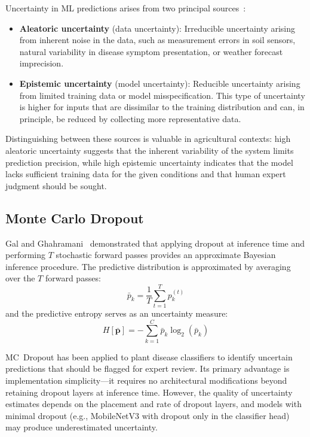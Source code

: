 \documentclass[journal]{IEEEtran}
\begin{document}
Uncertainty in ML predictions arises from two principal sources~\cite{abdar2021review}:
\begin{itemize}[leftmargin=*]
  \item \textbf{Aleatoric uncertainty} (data uncertainty): Irreducible uncertainty arising from inherent noise in the data, such as measurement errors in soil sensors, natural variability in disease symptom presentation, or weather forecast imprecision.
  
  \item \textbf{Epistemic uncertainty} (model uncertainty): Reducible uncertainty arising from limited training data or model misspecification. This type of uncertainty is higher for inputs that are dissimilar to the training distribution and can, in principle, be reduced by collecting more representative data.
\end{itemize}

Distinguishing between these sources is valuable in agricultural contexts: high aleatoric uncertainty suggests that the inherent variability of the system limits prediction precision, while high epistemic uncertainty indicates that the model lacks sufficient training data for the given conditions and that human expert judgment should be sought.

\subsection{Monte Carlo Dropout}

Gal and Ghahramani~\cite{gal2016dropout} demonstrated that applying dropout at inference time and performing $T$ stochastic forward passes provides an approximate Bayesian inference procedure. The predictive distribution is approximated by averaging over the $T$ forward passes:
\begin{equation}
  \bar{p}_k = \frac{1}{T} \sum_{t=1}^{T} p_k^{(t)}
\end{equation}
and the predictive entropy serves as an uncertainty measure:
\begin{equation}
  H[\bar{\mathbf{p}}] = -\sum_{k=1}^{C} \bar{p}_k \log_2(\bar{p}_k)
\end{equation}

MC~Dropout has been applied to plant disease classifiers to identify uncertain predictions that should be flagged for expert review. Its primary advantage is implementation simplicity---it requires no architectural modifications beyond retaining dropout layers at inference time. However, the quality of uncertainty estimates depends on the placement and rate of dropout layers, and models with minimal dropout (e.g., MobileNetV3 with dropout only in the classifier head) may produce underestimated uncertainty.
\end{document}
